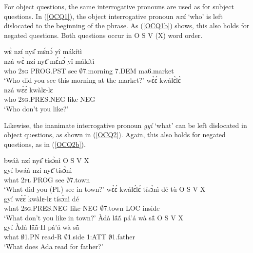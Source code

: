For object questions, the same interrogative pronouns are used as for subject questions. In (\ref{OCQ1}), the object interrogative pronoun {\itshape nzá} `who' is left dislocated to the beginning of the phrase. As (\ref{OCQ1b}) shows, this also holds for negated questions. Both questions occur in O S V (X) word order.

\begin{exe}
\ex\label{OCQ1}
\begin{xlist}
\ex\label{OCQ1a}
   wɛ̀ nzí nyɛ̂ mɛ́nɔ́ yî mákítì \\
      nzá wɛ̀ nzí nyɛ̂ mɛ́nɔ́ yî mákítì \\
             who 2\textsc{sg} PROG.PST see $\emptyset$7.morning 7.DEM ma6.market   \\
    \trans `Who did you see this morning at the market?'
\ex \label{OCQ1b}
   wɛ̀ɛ́ kwálɛ̀lɛ̀ \\ 
  nzá wɛ̀ɛ́ kwàlɛ-lɛ \\
               who 2\textsc{sg}.PRES.NEG like-NEG \\ 
    \trans `Who don't you like?'
\end{xlist}
\end{exe}

\noindent Likewise, the inanimate interrogative pronoun {\itshape gyí} `what' can be left dislocated in object questions, as shown in (\ref{OCQ2}). Again, this also holds for negated questions, as in (\ref{OCQ2b}). 

\begin{exe}
\ex\label{OCQ2}
\begin{xlist}
\ex\label{OCQ2a}
   bwáà nzí nyɛ̂ tísɔ̀nì \hfill O S V X \\
          gyí bwáà nzí nyɛ̂ tísɔ̀nì \\
             what 2\textsc{pl} PROG see $\emptyset$7.town   \\
    \trans `What did you (Pl.) see in town?'
\ex \label{OCQ2b}
   wɛ̀ɛ́ kwálɛ́lɛ́ tísɔ̀nì dé tù \hfill O S V X \\
          gyí wɛ̀ɛ́ kwàlɛ-lɛ tísɔ̀nì dé \\ 
              what 2\textsc{sg}.PRES.NEG like-NEG $\emptyset$7.town LOC inside\\
    \trans `What don't you like in town?'
\ex \label{OCQ2c}
  Àdà lã́ã́ pá'á wà sã̂  \hfill O S V X \\
           gyí Àdà lã́ã̀-H pá'á wà sã̂ \\
             what $\emptyset$1.PN read-R $\emptyset$1.side 1:ATT $\emptyset$1.father \\ 
    \trans `What does Ada read for father?'
\end{xlist}
\end{exe}

